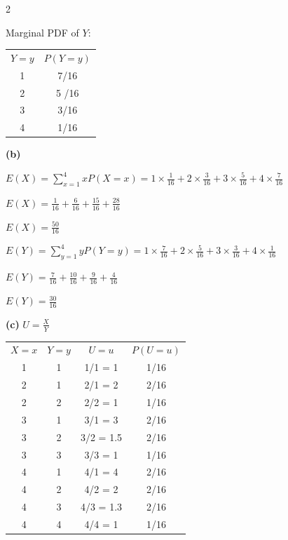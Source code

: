 \documentclass[12 pt]{article}
\begin{document}
\begin{exercise}{2}
    \hfill

    Marginal PDF of $Y$:

    \begin{tabular}{c|c}
         $Y=y$ & $P(Y=y)$  \\
         1 & 7/16 \\
         2 & 5 /16 \\
         3 & 3/16 \\
         4 & 1/16 \\
    \end{tabular}

    \hfill

    \textbf{(b)}

    $E(X) = \sum_{x=1}^{4} x P(X=x) = 1 \times \frac{1}{16} + 2 \times \frac{3}{16} + 3 \times \frac{5}{16} + 4 \times \frac{7}{16}$

    $E(X) = \frac{1}{16} + \frac{6}{16} + \frac{15}{16} + \frac{28}{16}$

    $E(X) = \frac{50}{16}$

    \hfill

    $E(Y) = \sum_{y=1}^{4} y P(Y=y) = 1 \times \frac{7}{16} + 2 \times \frac{5}{16} + 3 \times \frac{3}{16} + 4 \times \frac{1}{16}$

    $E(Y) = \frac{7}{16} + \frac{10}{16} + \frac{9}{16} + \frac{4}{16}$

    $E(Y) = \frac{30}{16}$

    \hfill

    \textbf{(c)} $U = \frac{X}{Y}$

    \hfill

    \begin{tabular}{c|c|c|c}
        $X=x$ &  $Y=y$ & $U=u$ & $P(U=u)$ \\
         1 & 1 & 1/1 = 1 & 1/16 \\
         2 & 1 & 2/1 = 2 & 2/16 \\
         2 & 2 & 2/2 = 1 & 1/16 \\
         3 & 1 & 3/1 = 3 & 2/16 \\
         3 & 2 & 3/2 = 1.5 & 2/16 \\
         3 & 3 & 3/3 = 1 & 1/16 \\
         4 & 1 & 4/1 = 4 & 2/16 \\
         4 & 2 & 4/2 = 2 & 2/16 \\
         4 & 3 & 4/3 = 1.3 & 2/16 \\
         4 & 4 & 4/4 = 1 & 1/16
    \end{tabular}


\end{exercise}
\end{document}
